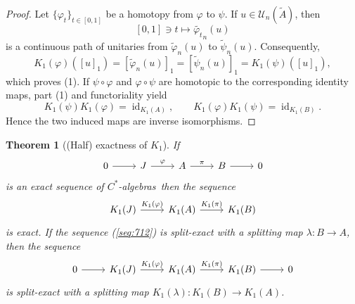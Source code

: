 \documentclass{book}
\newtheorem{theorem}[definition]{Theorem}
\def\cstars{\(C^*\)-algebras}
\begin{document}
\begin{proof}
  Let \(\{\varphi_t\}_{t\in[0,1]}\) be a homotopy from \(\varphi\) to \(\psi\). If
  \(u\in\mathcal{U}_n(\tilde A)\), then
  \[
    [0,1]\ni t\longmapsto\widetilde{\varphi_t}_n(u)
  \]
  is a continuous path of unitaries from \(\tilde\varphi_n(u)\) to \(\tilde\psi_n(u)\).
  Consequently,
  \[
    K_1(\varphi)({[u]}_1)={[\tilde\varphi_n(u)]}_1
    ={[\tilde\psi_n(u)]}_1=K_1(\psi)({[u]}_1),
  \]
  which proves (1). If \(\psi\circ\varphi\) and \(\varphi\circ\psi\) are homotopic to the
  corresponding identity maps, part (1) and functoriality yield
  \[
    K_1(\psi)K_1(\varphi)=\operatorname{id}_{K_1(A)},\qquad
    K_1(\varphi)K_1(\psi)=\operatorname{id}_{K_1(B)}.
  \]
  Hence the two induced maps are inverse isomorphisms.
\end{proof}
\begin{theorem}[(Half) exactness of \(K_1\)]
  If
  \begin{equation}\label{seq:712}
    \begin{tikzcd}
    0\arrow[r]& J \arrow[r, "\varphi"]& A \arrow[r, "\pi"]&B\arrow[r]& 0
    \end{tikzcd}
  \end{equation}
  is an exact sequence of \cstars\ then the sequence
  \begin{equation}\label{seq:713}
    \begin{tikzcd}
     K_1(J) \arrow[r, "K_1(\varphi)"]& K_1(A) \arrow[r, "K_1(\pi)"]&K_1(B)
    \end{tikzcd}
  \end{equation}
  is exact. If the sequence (\ref{seq:712}) is split-exact with a splitting map \(\lambda:B\rightarrow A\),
  then the sequence 
  \begin{equation}\label{seq:714}
    \begin{tikzcd}
    0\arrow[r] &K_1(J) \arrow[r, "K_1(\varphi)"]& K_1(A) \arrow[r, "K_1(\pi)"]&K_1(B)\arrow[r]& 0
    \end{tikzcd}
  \end{equation}
  is split-exact with a splitting map \(K_1(\lambda):K_1(B)\rightarrow K_1(A)\).
\end{theorem}
\end{document}
